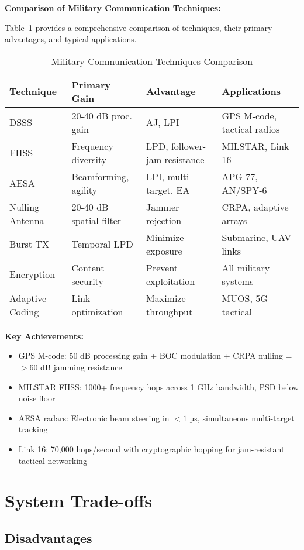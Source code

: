 \textbf{Comparison of Military Communication Techniques:}

Table~\ref{tab:military-techniques} provides a comprehensive comparison of techniques, their primary advantages, and typical applications.

\begin{table}[h]
\centering
\caption{Military Communication Techniques Comparison}
\label{tab:military-techniques}
\small
\begin{tabularx}{\textwidth}{@{}lXXX@{}}
\toprule
\textbf{Technique} & \textbf{Primary Gain} & \textbf{Advantage} & \textbf{Applications} \\
\midrule
DSSS & 20-40 dB proc. gain & AJ, LPI & GPS M-code, tactical radios \\
FHSS & Frequency diversity & LPD, follower-jam resistance & MILSTAR, Link 16 \\
AESA & Beamforming, agility & LPI, multi-target, EA & APG-77, AN/SPY-6 \\
Nulling Antenna & 20-40 dB spatial filter & Jammer rejection & CRPA, adaptive arrays \\
Burst TX & Temporal LPD & Minimize exposure & Submarine, UAV links \\
Encryption & Content security & Prevent exploitation & All military systems \\
Adaptive Coding & Link optimization & Maximize throughput & MUOS, 5G tactical \\
\bottomrule
\end{tabularx}
\end{table}

\textbf{Key Achievements:}
\begin{itemize}
\item GPS M-code: 50 dB processing gain + BOC modulation + CRPA nulling = $>60$ dB jamming resistance
\item MILSTAR FHSS: 1000+ frequency hops across 1 GHz bandwidth, PSD below noise floor
\item AESA radars: Electronic beam steering in $<1$ µs, simultaneous multi-target tracking
\item Link 16: 70,000 hops/second with cryptographic hopping for jam-resistant tactical networking
\end{itemize}

\section{System Trade-offs}

\subsection{Disadvantages}

